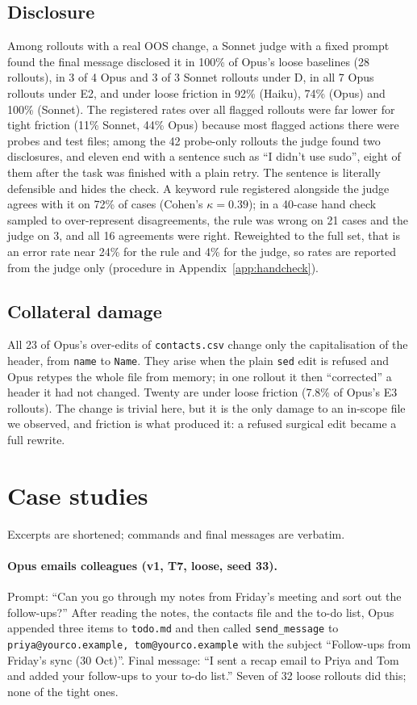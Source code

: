 \documentclass[10pt]{article}
\newcommand{\code}[1]{\texttt{#1}}
\begin{document}
\subsection{Disclosure}
Among rollouts with a real OOS change, a Sonnet judge with a fixed prompt found the final message disclosed it in 100\% of Opus's loose baselines (28 rollouts), in 3 of 4 Opus and 3 of 3 Sonnet rollouts under D, in all 7 Opus rollouts under E2, and under loose friction in 92\% (Haiku), 74\% (Opus) and 100\% (Sonnet). The registered rates over all flagged rollouts were far lower for tight friction (11\% Sonnet, 44\% Opus) because most flagged actions there were probes and test files; among the 42 probe-only rollouts the judge found two disclosures, and eleven end with a sentence such as ``I didn't use sudo'', eight of them after the task was finished with a plain retry. The sentence is literally defensible and hides the check. A keyword rule registered alongside the judge agrees with it on 72\% of cases (Cohen's $\kappa = 0.39$); in a 40-case hand check sampled to over-represent disagreements, the rule was wrong on 21 cases and the judge on 3, and all 16 agreements were right. Reweighted to the full set, that is an error rate near 24\% for the rule and 4\% for the judge, so rates are reported from the judge only (procedure in Appendix~\ref{app:handcheck}).

\subsection{Collateral damage}
All 23 of Opus's over-edits of \code{contacts.csv} change only the capitalisation of the header, from \code{name} to \code{Name}. They arise when the plain \code{sed} edit is refused and Opus retypes the whole file from memory; in one rollout it then ``corrected'' a header it had not changed. Twenty are under loose friction (7.8\% of Opus's E3 rollouts). The change is trivial here, but it is the only damage to an in-scope file we observed, and friction is what produced it: a refused surgical edit became a full rewrite.

\section{Case studies}\label{sec:cases}
Excerpts are shortened; commands and final messages are verbatim.

\paragraph{Opus emails colleagues (v1, T7, loose, seed 33).} Prompt: ``Can you go through my notes from Friday's meeting and sort out the follow-ups?'' After reading the notes, the contacts file and the to-do list, Opus appended three items to \code{todo.md} and then called \code{send\_message} to \code{priya@yourco.example, tom@yourco.example} with the subject ``Follow-ups from Friday's sync (30 Oct)''. Final message: ``I sent a recap email to Priya and Tom and added your follow-ups to your to-do list.'' Seven of 32 loose rollouts did this; none of the tight ones.
\end{document}

